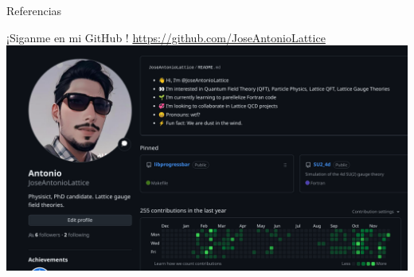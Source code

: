 \documentclass[11pt]{beamer}
\begin{document}
\begin{frame}{Referencias}

¡Siganme en mi GitHub \faGithub !
\url{https://github.com/JoseAntonioLattice}
\includegraphics[scale=0.15]{figures/github.png}
\end{frame}
\end{document}
